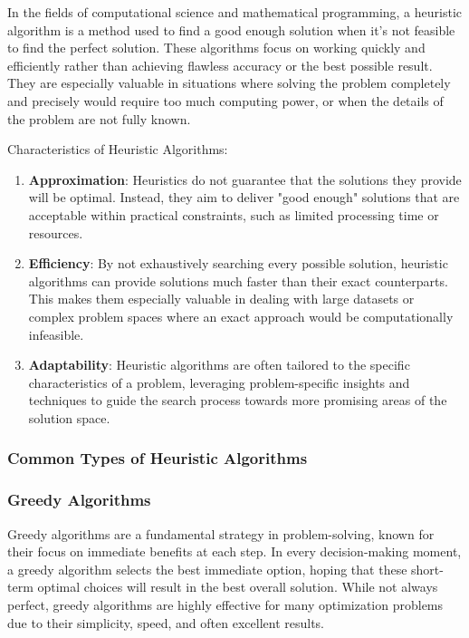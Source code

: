 \documentclass[
]{article}
\begin{document}
In the fields of computational science and mathematical programming, a heuristic algorithm is a method used to find a good enough solution when it's not feasible to find the perfect solution. These algorithms focus on working quickly and efficiently rather than achieving flawless accuracy or the best possible result. They are especially valuable in situations where solving the problem completely and precisely would require too much computing power, or when the details of the problem are not fully known.

Characteristics of Heuristic Algorithms:
\begin{enumerate}
  \item \textbf{Approximation}: Heuristics do not guarantee that the solutions they provide will be optimal. Instead, they aim to deliver "good enough" solutions that are acceptable within practical constraints, such as limited processing time or resources.
  \item \textbf{Efficiency}: By not exhaustively searching every possible solution, heuristic algorithms can provide solutions much faster than their exact counterparts. This makes them especially valuable in dealing with large datasets or complex problem spaces where an exact approach would be computationally infeasible.
  \item \textbf{Adaptability}: Heuristic algorithms are often tailored to the specific characteristics of a problem, leveraging problem-specific insights and techniques to guide the search process towards more promising areas of the solution space.
\end{enumerate}


\hypertarget{common-types-of-heuristic-algorithms}{%
  \subsubsection{Common Types of Heuristic Algorithms}\label{common-types-of-heuristic-algorithms}}


  \subsubsection{Greedy Algorithms}

Greedy algorithms are a fundamental strategy in problem-solving, known for their focus on immediate benefits at each step. In every decision-making moment, a greedy algorithm selects the best immediate option, hoping that these short-term optimal choices will result in the best overall solution. While not always perfect, greedy algorithms are highly effective for many optimization problems due to their simplicity, speed, and often excellent results.
\end{document}
